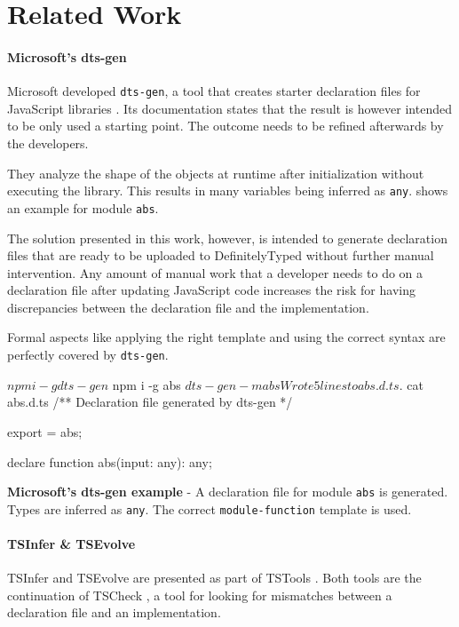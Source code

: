 \chapter{Related Work}\label{chap:relatedwork}

\subsubsection{Microsoft's dts-gen}
Microsoft developed \texttt{dts-gen}, a tool that creates starter declaration files for JavaScript libraries \citep{dts-gen}. Its documentation states that the result is however intended to be only used a starting point. The outcome needs to be refined afterwards by the developers.

They analyze the shape of the objects at runtime after initialization without executing the library. This results in many variables being inferred as \texttt{any}.  shows an example for module \texttt{abs}.

The solution presented in this work, however, is intended to generate declaration files that are ready to be uploaded to DefinitelyTyped without further manual intervention. Any amount of manual work that a developer needs to do on a declaration file after updating JavaScript code increases the risk for having discrepancies between the declaration file and the implementation.

Formal aspects like applying the right template and using the correct syntax are perfectly covered by \texttt{dts-gen}.

\begin{code}
	\begin{bashinline}
$ npm i -g dts-gen
$ npm i -g abs
$ dts-gen -m abs
Wrote 5 lines to abs.d.ts.

$ cat abs.d.ts
/** Declaration file generated by dts-gen */

export = abs;

declare function abs(input: any): any;
	  \end{bashinline}
	\caption[Microsoft's dts-gen example]{\textbf{Microsoft's dts-gen example} - A declaration file for module \texttt{abs} is generated. Types are inferred as \texttt{any}. The correct \texttt{module-function} template is used.}
	\label{code:related-work-dts-gen-example}
  \end{code}


\subsubsection{TSInfer \& TSEvolve}
TSInfer and TSEvolve are presented as part of TSTools \citep{DBLP:conf/fase/KristensenM17}. Both tools are the continuation of TSCheck \citep{DBLP:conf/oopsla/FeldthausM14}, a tool for looking for mismatches between a declaration file and an implementation.

